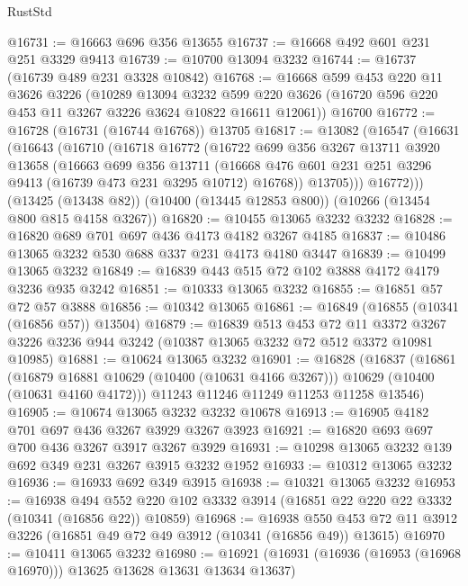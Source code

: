 \begin{lexlean}{RustStd}
\begin{coremodule}
{\begin{coremodule}
{{{{{{{{{{{{{{{{{{{{{{{{{@16731 := @16663 @696 @356 @13655
@16737 := @16668 @492 @601 @231 @251 @3329 @9413
@16739 := @10700 @13094 @3232
@16744 := @16737 (@16739 @489 @231 @3328 @10842)
@16768 := @16668
    @599
    @453
    @220
    @11
    @3626
    @3226
    (@10289
      @13094
      @3232
      @599
      @220
      @3626
      (@16720 @596 @220 @453 @11 @3267 @3226 @3624 @10822 @16611 @12061))
    @16700
@16772 := @16728 (@16731 (@16744 @16768)) @13705
@16817 := @13082
    (@16547
      (@16631
        (@16643
          (@16710
            (@16718
              @16772
              (@16722
                @699
                @356
                @3267
                @13711
                @3920
                @13658
                (@16663
                  @699
                  @356
                  @13711
                  (@16668 @476 @601 @231 @251 @3296 @9413 (@16739 @473 @231 @3295 @10712) @16768))
                @13705)))
          @16772)))
    (@13425 (@13438 @82))
    (@10400 (@13445 @12853 @800))
    (@10266 (@13454 @800 @815 @4158 @3267))
@16820 := @10455 @13065 @3232 @3232
@16828 := @16820 @689 @701 @697 @436 @4173 @4182 @3267 @4185
@16837 := @10486 @13065 @3232 @530 @688 @337 @231 @4173 @4180 @3447
@16839 := @10499 @13065 @3232
@16849 := @16839 @443 @515 @72 @102 @3888 @4172 @4179 @3236 @935 @3242
@16851 := @10333 @13065 @3232
@16855 := @16851 @57 @72 @57 @3888
@16856 := @10342 @13065
@16861 := @16849 (@16855 (@10341 (@16856 @57)) @13504)
@16879 := @16839
    @513
    @453
    @72
    @11
    @3372
    @3267
    @3226
    @3236
    @944
    @3242
    (@10387 @13065 @3232 @72 @512 @3372 @10981 @10985)
@16881 := @10624 @13065 @3232
@16901 := @16828
    (@16837
      (@16861
        (@16879 @16881 @10629 (@10400 (@10631 @4166 @3267)))
        @10629
        (@10400 (@10631 @4160 @4172)))
      @11243
      @11246
      @11249
      @11253
      @11258
      @13546)
@16905 := @10674 @13065 @3232 @3232 @10678
@16913 := @16905 @4182 @701 @697 @436 @3267 @3929 @3267 @3923
@16921 := @16820 @693 @697 @700 @436 @3267 @3917 @3267 @3929
@16931 := @10298 @13065 @3232 @139 @692 @349 @231 @3267 @3915 @3232 @1952
@16933 := @10312 @13065 @3232
@16936 := @16933 @692 @349 @3915
@16938 := @10321 @13065 @3232
@16953 := @16938
    @494
    @552
    @220
    @102
    @3332
    @3914
    (@16851 @22 @220 @22 @3332 (@10341 (@16856 @22)) @10859)
@16968 := @16938
    @550
    @453
    @72
    @11
    @3912
    @3226
    (@16851 @49 @72 @49 @3912 (@10341 (@16856 @49)) @13615)
@16970 := @10411 @13065 @3232
@16980 := @16921 (@16931 (@16936 (@16953 (@16968 @16970))) @13625 @13628 @13631 @13634 @13637)
}}}}}}}}}}}}}}}}}}}}}}}}}
\end{coremodule}}
\end{coremodule}
\end{lexlean}
